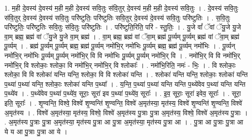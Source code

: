 \documentclass[17pt]{extarticle}
\begin{document}
1. म॒ही दे॒वस्य॑ दे॒वस्य॑ म॒ही म॒ही दे॒वस्य॑ सवि॒तुः स॑वि॒तुर् दे॒वस्य॑ म॒ही म॒ही दे॒वस्य॑ सवि॒तुः । . दे॒वस्य॑ सवि॒तुः स॑वि॒तुर् दे॒वस्य॑ दे॒वस्य॑ सवि॒तुः परि॑ष्टुतिः॒ परि॑ष्टुतिः सवि॒तुर् दे॒वस्य॑ दे॒वस्य॑ सवि॒तुः परि॑ष्टुतिः । . स॒वि॒तुः परि॑ष्टुतिः॒ परि॑ष्टुतिः सवि॒तुः स॑वि॒तुः परि॑ष्टुतिः । . परि॑ष्टुति॒रिति॒ परि॑ - स्तु॒तिः॒ । . यु॒जे वां᳚ ॅवां ॅयु॒जे यु॒जे वा॒म् ब्रह्म॒ ब्रह्म॑ वां ॅयु॒जे यु॒जे वा॒म् ब्रह्म॑ । . वा॒म् ब्रह्म॒ ब्रह्म॑ वां ॅवा॒म् ब्रह्म॑ पू॒र्व्यम् पू॒र्व्यम् ब्रह्म॑ वां ॅवा॒म् ब्रह्म॑ पू॒र्व्यम् । . ब्रह्म॑ पू॒र्व्यम् पू॒र्व्यम् ब्रह्म॒ ब्रह्म॑ पू॒र्व्यम् नमो॑भि॒र् नमो॑भिः पू॒र्व्यम् ब्रह्म॒ ब्रह्म॑ पू॒र्व्यम् नमो॑भिः । . पू॒र्व्यन् नमो॑भि॒र् नमो॑भिः पू॒र्व्यम् पू॒र्व्यम् नमो॑भि॒र् वि वि नमो॑भिः पू॒र्व्यम् पू॒र्व्यम् नमो॑भि॒र् वि । . नमो॑भि॒र् वि वि नमो॑भि॒र् नमो॑भि॒र् वि श्लोकाः॒ श्लोका॒ वि नमो॑भि॒र् नमो॑भि॒र् वि श्लोकाः᳚ । . नमो॑भि॒रिति॒ नमः॑ - भिः॒ । . वि श्लोकाः॒ श्लोका॒ वि वि श्लोका॑ यन्ति यन्ति॒ श्लोका॒ वि वि श्लोका॑ यन्ति । . श्लोका॑ यन्ति यन्ति॒ श्लोकाः॒ श्लोका॑ यन्ति प॒थ्या॑ प॒थ्या॑ यन्ति॒ श्लोकाः॒ श्लोका॑ यन्ति प॒थ्या᳚ । . य॒न्ति॒ प॒थ्या॑ प॒थ्या॑ यन्ति यन्ति प॒थ्ये॑वेव प॒थ्या॑ यन्ति यन्ति प॒थ्ये॑व । . प॒थ्ये॑वेव प॒थ्या॑ प॒थ्ये॑व॒ सूराः॒ सूरा॑ इव प॒थ्या॑ प॒थ्ये॑व॒ सूराः᳚ । . इ॒व॒ सूराः॒ सूरा॑ इवेव॒ सूराः᳚ । . सूरा॒ इति॒ सूराः᳚ । . शृ॒ण्वन्ति॒ विश्वे॒ विश्वे॑ शृ॒ण्वन्ति॑ शृ॒ण्वन्ति॒ विश्वे॑ अ॒मृत॑स्या॒ मृत॑स्य॒ विश्वे॑ शृ॒ण्वन्ति॑ शृ॒ण्वन्ति॒ विश्वे॑ अ॒मृत॑स्य । . विश्वे॑ अ॒मृत॑स्या॒ मृत॑स्य॒ विश्वे॒ विश्वे॑ अ॒मृत॑स्य पु॒त्राः पु॒त्रा अ॒मृत॑स्य॒ विश्वे॒ विश्वे॑ अ॒मृत॑स्य पु॒त्राः । . अ॒मृत॑स्य पु॒त्राः पु॒त्रा अ॒मृत॑स्या॒ मृत॑स्य पु॒त्रा आ पु॒त्रा अ॒मृत॑स्या॒ मृत॑स्य पु॒त्रा आ । . पु॒त्रा आ पु॒त्राः पु॒त्रा आ ये य आ पु॒त्राः पु॒त्रा आ ये । \newline
\end{document}
